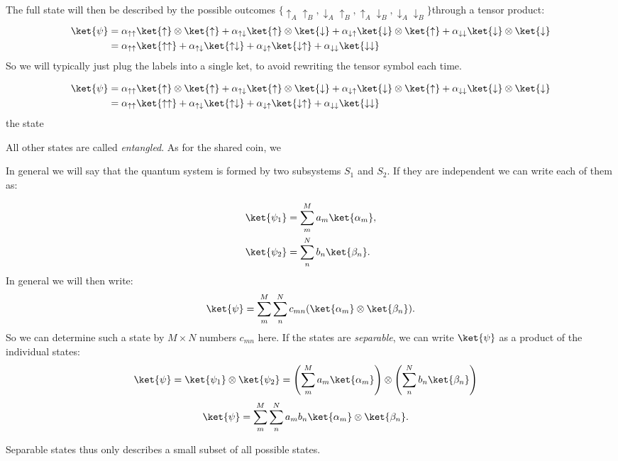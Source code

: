 The full state will then be described by the possible outcomes $\{\uparrow_A\uparrow_B,\downarrow_A\uparrow_B,\uparrow_A\downarrow_B, \downarrow_A\downarrow_B\}$through a tensor product:
\begin{align}
\ket{\psi} &= \alpha_{\uparrow\uparrow}\ket{\uparrow}\otimes\ket{\uparrow}+\alpha_{\uparrow\downarrow}\ket{\uparrow}\otimes\ket{\downarrow}+\alpha_{\downarrow\uparrow}\ket{\downarrow}\otimes\ket{\uparrow}+\alpha_{\downarrow\downarrow}\ket{\downarrow}\otimes\ket{\downarrow}\\
&= \alpha_{\uparrow\uparrow}\ket{\uparrow\uparrow}+\alpha_{\uparrow\downarrow}\ket{\uparrow\downarrow}+\alpha_{\downarrow\uparrow}\ket{\downarrow \uparrow}+\alpha_{\downarrow\downarrow}\ket{\downarrow\downarrow}
\end{align}
So we will typically just plug the labels into a single ket, to avoid rewriting the tensor symbol each time. 

\begin{align}
\ket{\psi} &= \alpha_{\uparrow\uparrow}\ket{\uparrow}\otimes\ket{\uparrow}+\alpha_{\uparrow\downarrow}\ket{\uparrow}\otimes\ket{\downarrow}+\alpha_{\downarrow\uparrow}\ket{\downarrow}\otimes\ket{\uparrow}+\alpha_{\downarrow\downarrow}\ket{\downarrow}\otimes\ket{\downarrow}\\
&= \alpha_{\uparrow\uparrow}\ket{\uparrow\uparrow}+\alpha_{\uparrow\downarrow}\ket{\uparrow\downarrow}+\alpha_{\downarrow\uparrow}\ket{\downarrow \uparrow}+\alpha_{\downarrow\downarrow}\ket{\downarrow\downarrow}
\end{align}
the state 

All other states are called \textit{entangled}. As for the shared coin, we


In general we will say that the quantum system is formed by two subsystems $S_1$ and $S_2$. If they are independent we can write each of them as:

\begin{align}
				\ket{\psi_1}&=\sum_m^M a_m \ket{\alpha_m},\\
				\ket{\psi_2}&=\sum_n^N b_n \ket{\beta_n}.
			
\end{align}
In general we will then write:
\begin{align}
\ket{\psi}=\sum_m^M \sum_n^N c_{mn}(\ket{\alpha_m}\otimes \ket{\beta_n}).
\end{align}
So we can determine such a state by $M \times N$ numbers $c_{mn}$ here.  If the states are \textit{separable}, we can write $\ket{\psi}$ as a product of the individual states:
\begin{align}
 \label{eq:psientangled} 
	\ket{\psi}	&=\ket{\psi_1}\otimes\ket{\psi_2}=\left(\sum_m^M a_m \ket{\alpha_m}\right) \otimes \left(\sum_n^N b_n \ket{\beta_n}\right)
\end{align}
\begin{align}
\ket{\psi}	&=\sum_m^M \sum_n^N a_m b_n \ket{\alpha_m} \otimes \ket{\beta_n}. \label{eq:psientangled3} 
\end{align}

Separable states thus only describes a small subset of all possible states. 